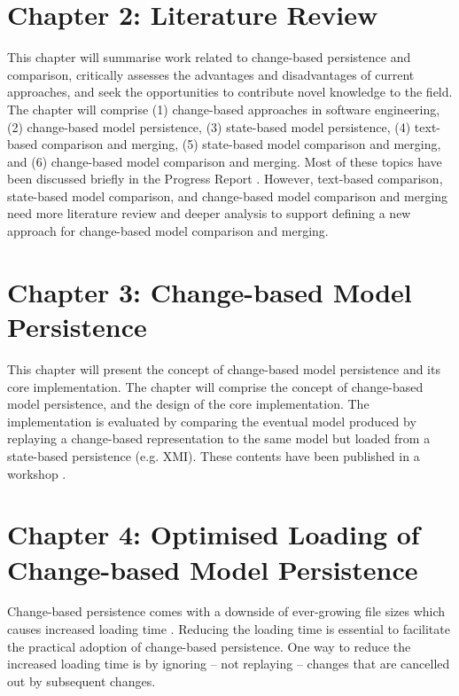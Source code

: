 \documentclass[12pt, a4paper]{report} \usepackage[titletoc]{appendix}
\begin{document}
\section{Chapter 2: Literature Review}
\label{sec:chapter_2_literature_review_plan}
This chapter will summarise work related to change-based persistence and comparison, critically assesses the advantages and disadvantages of current approaches, and seek the opportunities to contribute novel knowledge to the field. The chapter will comprise (1) change-based approaches in software engineering, (2) change-based model persistence, (3) state-based model persistence, (4) text-based comparison and merging, (5) state-based model comparison and merging, and (6) change-based model comparison and merging. Most of these topics have been discussed briefly in the Progress Report \cite{yohannis2017progress}. However, text-based comparison, state-based model comparison, and change-based model comparison and merging need more literature review and deeper analysis to support defining a new approach for change-based model comparison and merging.


\section{Chapter 3: Change-based Model Persistence}
\label{sec:chapter_3_Change-based_model_ersistence_plan}
This chapter will present the concept of change-based model persistence and its core implementation. The chapter will comprise the concept of change-based model persistence, and the design of the core implementation. The implementation is evaluated by comparing the eventual model produced by replaying a change-based representation to the same model but loaded from a state-based persistence (e.g. XMI). These contents have been published in a workshop \cite{DBLP:conf/models/YohannisKP17}.


\section{Chapter 4: Optimised Loading of Change-based Model Persistence}
\label{sec:chapter_4_optimised_loading_change_based_model_persistence}

Change-based persistence comes with a downside of ever-growing file sizes \cite{DBLP:journals/entcs/RobbesL07,DBLP:conf/edoc/KoegelHLHD10} which causes increased loading time \cite{mens2002state}. Reducing the loading time is essential to facilitate the practical adoption of change-based persistence. One way to reduce the increased loading time is by ignoring -- not replaying -- changes that are cancelled out by subsequent changes. 
\end{document}
